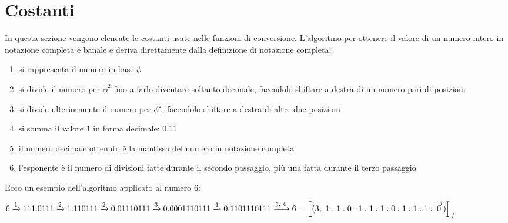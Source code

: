 \documentclass[Lau]{sapthesis}
\begin{document}
\section{Costanti}
In questa sezione vengono elencate le costanti usate nelle funzioni di conversione. L'algoritmo per ottenere il valore di un numero intero in notazione completa è banale e deriva direttamente dalla definizione di notazione completa:\\
\begin{enumerate}[(1)]
\item si rappresenta il numero in base $\phi$\\
\item si divide il numero per $\phi^2$ fino a farlo diventare soltanto decimale, facendolo shiftare a destra di un numero pari di posizioni\\
\item si divide ulteriormente il numero per $\phi^2$, facendolo shiftare a destra di altre due posizioni\\
\item si somma il valore 1 in forma decimale: $0.11$\\
\item il numero decimale ottenuto è la mantissa del numero in notazione completa\\
\item l'esponente è il numero di divisioni fatte durante il secondo passaggio, più una fatta durante il terzo passaggio
\end{enumerate}
Ecco un esempio dell'algoritmo applicato al numero 6:
\begin{center}
$6 \xrightarrow{1} 111.0111 \xrightarrow{2} 1.110111 \xrightarrow{2} 0.01110111  \xrightarrow{3} 0.0001110111 \xrightarrow{4} 0.1101110111 \xrightarrow{5, \ 6} \newline\newline
6 = \left\llbracket (3, \ 1:1:0:1:1:1:0:1:1:1:\overrightarrow{0}) \right\rrbracket_f$
\end{center}
\end{document}
